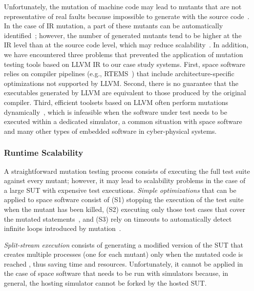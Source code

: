Unfortunately, the mutation of machine code 
may lead to mutants that are not representative of real faults because impossible to generate with the source code~\cite{schuler2009efficient}.
In the case of IR mutation, a part of these mutants can be automatically identified~\cite{denisov2018mull}; however,
the number of generated mutants tend to be higher at the IR level than at the source code level, which may reduce scalability~\cite{hariri2019comparing}.
 In addition, we have encountered three problems that prevented the application of 
 mutation testing tools based on  LLVM IR to our case study systems.
First, space software relies on compiler pipelines (e.g., RTEMS~\cite{RTEMS}) that include architecture-specific optimizations not supported by LLVM. 
Second, there is no guarantee that the executables generated by LLVM are equivalent to those produced by the original compiler.
 Third, efficient toolsets based on LLVM often  perform mutations dynamically~\cite{denisov2018mull}, which is infeasible when the software under test needs to be executed within a dedicated simulator, a common situation with space software and many other types of embedded software in cyber-physical systems.




\subsubsection{Runtime Scalability}
\label{sec:scalability}

A straightforward mutation testing process consists of executing the full test suite against every mutant; however, it may lead to scalability problems in the case of a large SUT with expensive test executions.
\emph{Simple optimizations} that can be applied to space software consist of (S1) stopping the execution of the test suite when the mutant has been killed, (S2) executing only those test cases that cover the mutated statements~\cite{delamaro1996proteum}, and (S3) rely on timeouts to automatically detect infinite loops introduced by mutation~\cite{papadakis2019mutation}. 

\emph{Split-stream execution} consists of generating a modified version of the SUT that creates multiple processes (one for each mutant) only when the mutated code is reached \cite{king1991fortran,tokumoto2016muvm}, thus saving time and resources. Unfortunately, it cannot be applied in the case of space software that needs to be run with simulators because, in general, the hosting simulator cannot be forked by the hosted SUT.

